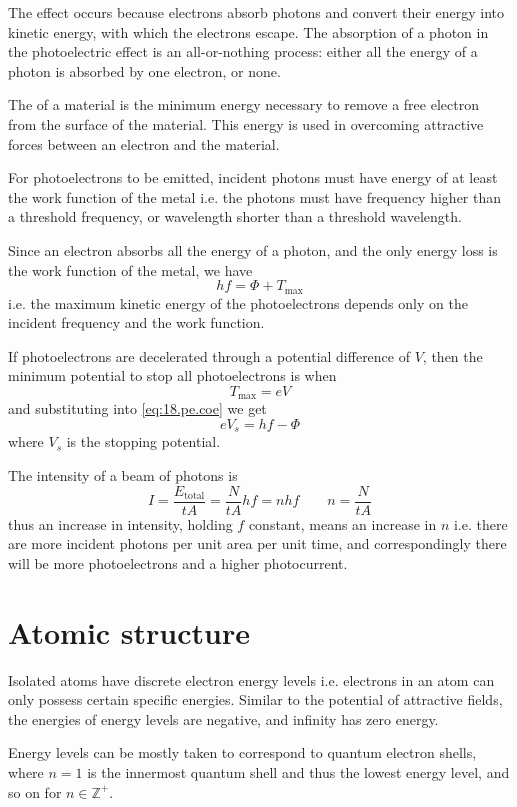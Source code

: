 \documentclass[Physics.tex]{subfiles}
\begin{document}
The effect occurs because electrons absorb photons and convert their energy into kinetic energy, with which the electrons escape. The absorption of a photon in the photoelectric effect is an all-or-nothing process: either all the energy of a photon is absorbed by one electron, or none.

The  of a material is the minimum energy necessary to remove a free electron from the surface of the material. This energy is used in overcoming attractive forces between an electron and the material.

For photoelectrons to be emitted, incident photons must have energy of at least the work function of the metal i.e. the photons must have frequency higher than a threshold frequency, or wavelength shorter than a threshold wavelength.

Since an electron absorbs all the energy of a photon, and the only energy loss is the work function of the metal, we have \begin{equation}hf = \Phi + T_\text{max}\label{eq:18.pe.coe}\end{equation} i.e. the maximum kinetic energy of the photoelectrons depends only on the incident frequency and the work function.

If photoelectrons are decelerated through a potential difference of \(V\), then the minimum potential to stop all photoelectrons is when \[T_\text{max} = eV\] and substituting into \eqref{eq:18.pe.coe} we get \begin{equation}eV_s = hf - \Phi\end{equation} where \(V_s\) is the stopping potential.

The intensity of a beam of photons is \[I = \frac{E_\text{total}}{tA} = \frac{N}{tA}hf = nhf\qquad n = \frac{N}{tA}\] thus an increase in intensity, holding \(f\) constant, means an increase in \(n\) i.e. there are more incident photons per unit area per unit time, and correspondingly there will be more photoelectrons and a higher photocurrent.
\section{Atomic structure}
Isolated atoms have discrete electron energy levels i.e. electrons in an atom can only possess certain specific energies. Similar to the potential of attractive fields, the energies of energy levels are negative, and infinity has zero energy.

Energy levels can be mostly taken to correspond to quantum electron shells, where \(n=1\) is the innermost quantum shell and thus the lowest energy level, and so on for \(n \in \mathbb{Z}^+\).
\end{document}
